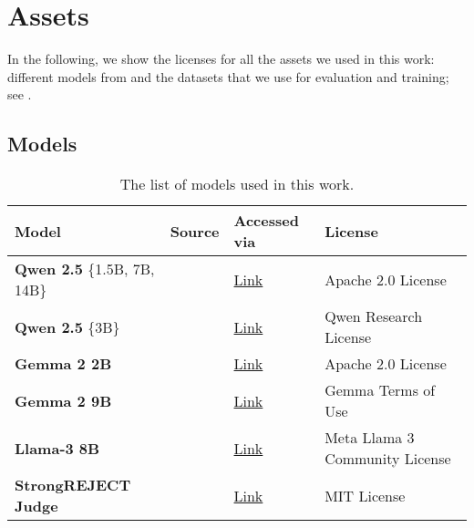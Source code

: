 \newpage
\section{Assets}
In the following, we show the licenses for all the assets we used in this work: different models from  and the datasets that we use for evaluation and training; see .
\subsection{Models}
\begin{table}[h!]
    \centering
    \caption{The list of models used in this work.}
    \label{tab:models_used}
    \renewcommand{\arraystretch}{1.2}
    \begin{tabular}{l l l l}
        \hline
        \textbf{Model} & \textbf{Source} & \textbf{Accessed via} & \textbf{License} \\
        \hline
        \textbf{Qwen 2.5} \{1.5B, 7B, 14B\}& \citet{yang2024qwen2} & \href{https://github.com/QwenLM/Qwen/}{Link} & Apache 2.0 License \\
        \textbf{Qwen 2.5} \{3B\}& \citet{yang2024qwen2} & \href{https://huggingface.co/Qwen/Qwen-3B}{Link} & Qwen Research License\\
        \textbf{Gemma 2 2B} & \citet{team2024gemma} & \href{https://huggingface.co/google/gemma-2-2b}{Link} & Apache 2.0 License \\
        \textbf{Gemma 2 9B} & \citet{team2024gemma} & \href{https://huggingface.co/google/gemma-2-9b}{Link} & Gemma Terms of Use \\
        \textbf{Llama-3 8B} & \citet{dubey2024llama} & \href{https://huggingface.co/meta-llama/Meta-Llama-3-8B}{Link} & Meta Llama 3 Community License \\
        \textbf{StrongREJECT Judge} & \citet{souly2024strongreject} & \href{https://huggingface.co/qylu4156/strongreject-15k-v1}{Link} & MIT License \\
        \hline
    \end{tabular}
\end{table}

